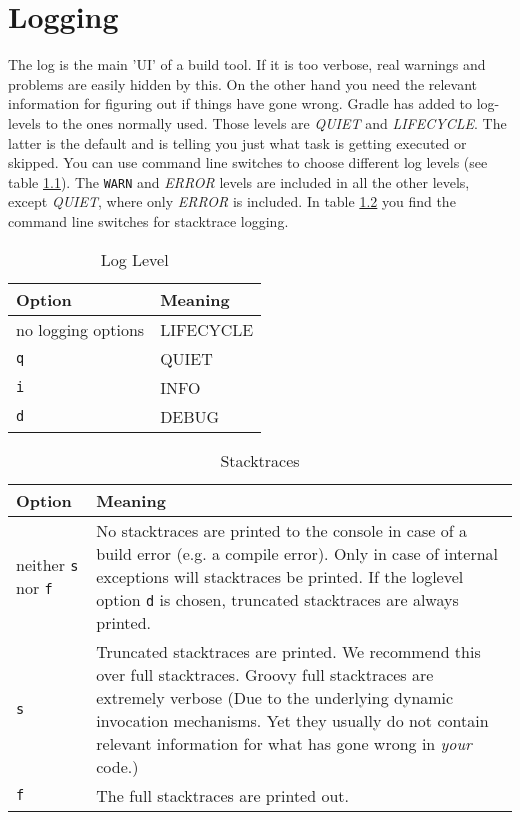 \chapter{Logging} %
\label{cha:logging}
The log is the main 'UI' of a build tool. If it is too verbose, real warnings and problems are easily hidden by this. On the other hand you need the relevant information for figuring out if things have gone wrong. Gradle has added to log-levels to the ones normally used. Those levels are \emph{QUIET} and \emph{LIFECYCLE}. The latter is the default and is telling you just what task is getting executed or skipped. You can use command line switches to choose different log levels (see table \ref{loglevels}). The \texttt{WARN} and \emph{ERROR} levels are included in all the other levels, except \emph{QUIET}, where only \emph{ERROR} is included. In table {\ref{stacktraces}} you find the command line switches for stacktrace logging.


\label{sec:command_line_switches}
\begin{table}
	\begin{center}
    \begin{tabular}{|l|l|} \hline
    Option & Meaning  \\ \hline
    no logging options & LIFECYCLE  \\ \hline
    \texttt{q} & QUIET  \\ \hline
    \texttt{i} & INFO  \\ \hline
    \texttt{d} & DEBUG \\ \hline
    \end{tabular}
	\end{center}
	\caption{Log Level}
	\label{loglevels}
\end{table}

\begin{table}
	\begin{center}
    \begin{tabular}{|l|p{15cm}|} \hline
    Option & Meaning  \\ \hline
    neither \texttt{s} nor \texttt{f} & No stacktraces are printed to the console in case of a build error (e.g. a compile error). Only in case of internal exceptions will stacktraces be printed. If the loglevel option \texttt{d} is chosen, truncated stacktraces are always printed. \\ \hline
    \texttt{s} & Truncated stacktraces are printed. We recommend this over full stacktraces. Groovy full stacktraces are extremely verbose (Due to the underlying dynamic invocation mechanisms. Yet they usually do not contain relevant information for what has gone wrong in \emph{your} code.)  \\ \hline
    \texttt{f} & The full stacktraces are printed out. \\ \hline
    \end{tabular}
	\end{center}
	\caption{Stacktraces}
	\label{stacktraces}
\end{table}

